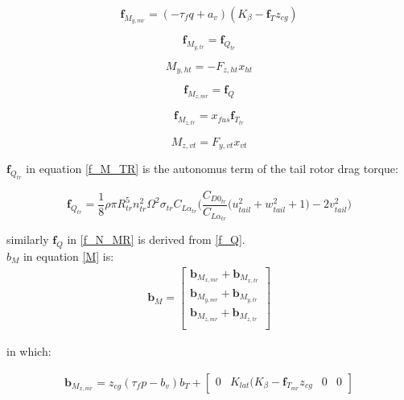 \begin{equation}
	\textbf{f}_{ M_{y,mr}}=(-\tau_fq+a_v)(K_{\beta}-\textbf{f}_T z_{cg})
\end{equation}

\begin{equation}\label{f_M_TR}
	\textbf{f}_{ M_{y,tr}}=\textbf{f}_{Q_{tr}}
\end{equation}

\begin{equation}
	M_{y,ht}=- F_{z,ht}x_{ht}
\end{equation}
 
\begin{equation} \label{f_N_MR}
	\textbf{f}_{ M_{z,mr}}=\textbf{f}_Q
\end{equation}

\begin{equation}
	\textbf{f}_{ M_{z,tr}}=x_{fus}\textbf{f}_{T_{tr}}
\end{equation}

\begin{equation}
	M_{z,vt}=F_{y,vt}x_{vt}
\end{equation}

$\textbf{f}_{Q_{tr}}$ in equation \ref{f_M_TR} is the autonomus term of the tail rotor drag torque:

\begin{equation}
	\textbf{f}_{Q_{tr}}=\frac{1}{8} \rho \pi R_{tr}^5 n_{tr}^2 \Omega^2 \sigma_{tr} C_{L\alpha_{tr}}  \bigg( \frac{C_{D0_{tr}}}{C_{L\alpha_{tr}}} \Big( u_{tail}^2+w_{tail}^2+1 \Big)-2v_{tail}^2 \bigg)
\end{equation}

similarly $\textbf{f}_Q$ in \ref{f_N_MR} is derived from \ref{f_Q}.\\

$b_M$ in equation \ref{M} is:
\begin{gather}
	\textbf{b}_M=\begin{bmatrix}
		\textbf{b}_{ M_{x,mr}}+\textbf{b}_{ M_{x,tr}}\\
		\textbf{b}_{ M_{y,mr}}+\textbf{b}_{ M_{y,tr}}\\
		\textbf{b}_{ M_{z,mr}}+\textbf{b}_{ M_{z,tr}} \\
	\end{bmatrix}
\end{gather}

in which:

\begin{gather}
	\textbf{b}_{ M_{x,mr}}=z_{cg}(\tau_fp-b_v)b_T+ \begin{bmatrix}
		0&K_{lat}(K_{\beta}-\textbf{f}_{T_{mr}}z_{cg}&0&0
	\end{bmatrix}
\end{gather}

